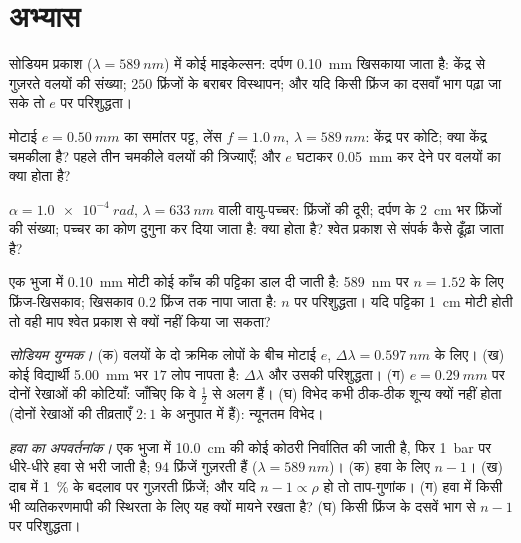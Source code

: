 \section{अभ्यास}

\begin{exercise}[$\star$]\label{exo:b2:michelson:1}
सोडियम प्रकाश ($\lambda = \qty{589}{nm}$) में कोई माइकेल्सन: दर्पण
\qty{0.10}{mm} खिसकाया जाता है: केंद्र से गुज़रते वलयों की संख्या; $250$ फ्रिंजों
के बराबर विस्थापन; और यदि किसी फ्रिंज का दसवाँ भाग पढ़ा जा सके तो $e$ पर
परिशुद्धता।
\end{exercise}

\begin{exercise}[$\star$]\label{exo:b2:michelson:2}
मोटाई $e = \qty{0.50}{mm}$ का समांतर पट्ट, लेंस $f = \qty{1.0}{m}$, $\lambda =
\qty{589}{nm}$: केंद्र पर कोटि; क्या केंद्र चमकीला है? पहले तीन चमकीले
वलयों की त्रिज्याएँ; और $e$ घटाकर \qty{0.05}{mm} कर देने पर वलयों का
क्या होता है?
\end{exercise}

\begin{exercise}[$\star$]\label{exo:b2:michelson:3}
$\alpha = \qty{1.0e-4}{rad}$, $\lambda = \qty{633}{nm}$ वाली वायु-पच्चर: फ्रिंजों की दूरी;
दर्पण के \qty{2}{cm} भर फ्रिंजों की संख्या; पच्चर का कोण
दुगुना कर दिया जाता है: क्या होता है? श्वेत प्रकाश से संपर्क कैसे ढूँढ़ा जाता है?
\end{exercise}

\begin{exercise}[$\star$]\label{exo:b2:michelson:4}
एक भुजा में \qty{0.10}{mm} मोटी कोई काँच की पट्टिका डाल दी जाती है: \qty{589}{nm} पर
$n = 1.52$ के लिए फ्रिंज-खिसकाव; खिसकाव $0.2$ फ्रिंज तक नापा जाता है: $n$ पर
परिशुद्धता। यदि पट्टिका \qty{1}{cm} मोटी होती तो वही माप श्वेत प्रकाश से क्यों
नहीं किया जा सकता?
\end{exercise}

\begin{exercise}[$\star\star$]\label{exo:b2:michelson:5}
\emph{सोडियम युग्मक।} (क) वलयों के दो क्रमिक लोपों के बीच मोटाई $e$,
$\Delta\lambda = \qty{0.597}{nm}$ के लिए। (ख) कोई विद्यार्थी
\qty{5.00}{mm} भर $17$ लोप नापता है: $\Delta\lambda$ और उसकी परिशुद्धता।
(ग) $e = \qty{0.29}{mm}$ पर दोनों रेखाओं की कोटियाँ: जाँचिए कि वे
$\tfrac12$ से अलग हैं। (घ) विभेद कभी ठीक-ठीक शून्य क्यों नहीं होता (दोनों रेखाओं की
तीव्रताएँ $2 : 1$ के अनुपात में हैं): न्यूनतम विभेद।
\end{exercise}

\begin{exercise}[$\star\star$]\label{exo:b2:michelson:6}
\emph{हवा का अपवर्तनांक।} एक भुजा में \qty{10.0}{cm} की कोई कोठरी निर्वातित की
जाती है, फिर \qty{1}{bar} पर धीरे-धीरे हवा से भरी जाती है; $94$ फ्रिंजें गुज़रती हैं ($\lambda = \qty{589}{nm}$)।
(क) हवा के लिए $n - 1$। (ख) दाब में \qty{1}{\%} के बदलाव पर गुज़रती
फ्रिंजें; और यदि $n - 1 \propto \rho$ हो तो ताप-गुणांक। (ग) हवा में किसी भी
व्यतिकरणमापी की स्थिरता के लिए यह क्यों मायने रखता है? (घ) किसी फ्रिंज के दसवें भाग से
$n - 1$ पर परिशुद्धता।
\end{exercise}

